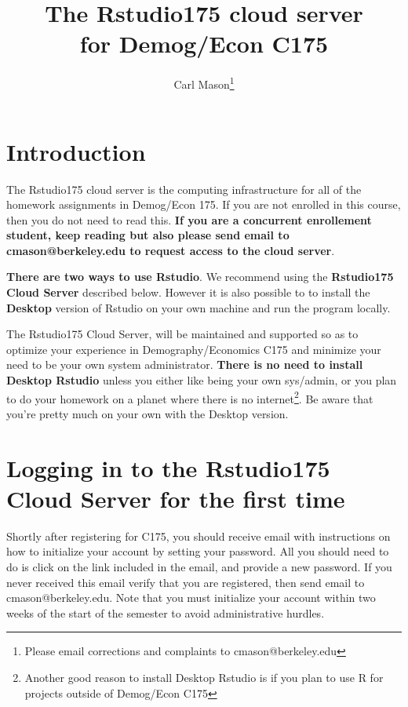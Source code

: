 \documentclass[11pt]{article}
\begin{document}
\title{The Rstudio175 cloud server\\
for Demog/Econ C175}
\author{Carl Mason\footnote{Please email corrections and complaints to cmason@berkeley.edu}}
\maketitle

\tableofcontents

\section{Introduction}

The Rstudio175 cloud server is the computing infrastructure for all of the homework assignments in Demog/Econ 175. If you are not enrolled in this course, then you do not need to read this.  \textbf{If you are a concurrent enrollement student, keep reading but also please send email to cmason@berkeley.edu to request access to the cloud server}.

\begin{minipage}[H]{1.0\linewidth}

\begin{mdframed}[backgroundcolor=blue!20]        
\textbf{There are two ways to use Rstudio}. We recommend using the \textbf{Rstudio175 Cloud Server} described below. However it is also possible to  to install the \textbf{Desktop} version of  Rstudio on your own machine and run the program locally.

The Rstudio175 Cloud Server, will be maintained and supported so as to optimize your experience in Demography/Economics C175 and minimize your need to be your own system administrator.  \textbf{There is no need to install Desktop Rstudio} unless you either like  being your own sys/admin, or you plan to do your homework on a planet where there is no internet\footnote{Another good reason to install Desktop Rstudio is if you plan to use R for projects outside of Demog/Econ C175}. Be aware that you're pretty much on your own with the Desktop version.  
\end{mdframed}
  
\end{minipage}
\section{Logging in to the Rstudio175 Cloud Server for the first time}

Shortly after registering for C175, you should receive email with instructions on how to initialize your account by setting your password.  All you should need to do is click on the link included in the email, and provide a new password.  If you never received this email verify that you are registered, then send email to cmason@berkeley.edu.  Note that you must initialize your account within two weeks of the start of the semester to avoid administrative hurdles.
\end{document}
